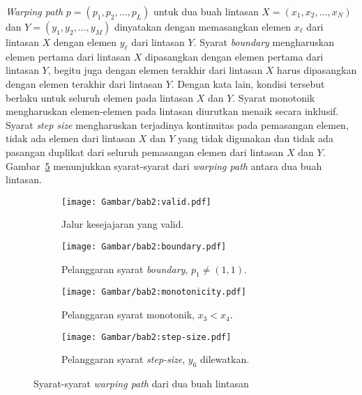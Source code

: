 \textit{Warping path} $p = (p_1, p_2, \ldots, p_L)$ untuk dua buah lintasan $X = (x_1, x_2, \ldots, x_N)$ dan $Y = (y_1, y_2, \ldots, y_M)$ dinyatakan dengan memasangkan elemen $x_\ell$ dari lintasan $X$ dengan elemen $y_\ell$ dari lintasan $Y$. Syarat \textit{boundary} mengharuskan elemen pertama dari lintasan $X$ dipasangkan dengan elemen pertama dari lintasan $Y$, begitu juga dengan elemen terakhir dari lintasan $X$ harus dipasangkan dengan elemen terakhir dari lintasan $Y$. Dengan kata lain, kondisi tersebut berlaku untuk seluruh elemen pada lintasan $X$ dan $Y$. Syarat monotonik mengharuskan elemen-elemen pada lintasan diurutkan menaik secara inklusif. Syarat \textit{step size} mengharuskan terjadinya kontinuitas pada pemasangan elemen, tidak ada elemen dari lintasan $X$ dan $Y$ yang tidak digunakan dan tidak ada pasangan duplikat dari seluruh pemasangan elemen dari lintasan $X$ dan $Y$. Gambar~\ref{bab2:dtw-requirements} menunjukkan syarat-syarat dari \textit{warping path} antara dua buah lintasan.

\vspace{10pt}

\begin{figure}[h]
    \centering
    \begin{subfigure}[ht]{0.225\textwidth}
        \centering
        \texttt{[image: Gambar/bab2:valid.pdf]}
        \caption{Jalur kesejajaran yang valid.}
        \label{bab2:valid}
    \end{subfigure}
    \begin{subfigure}[ht]{0.225\textwidth}
        \centering
        \texttt{[image: Gambar/bab2:boundary.pdf]}
        \caption{Pelanggaran syarat \textit{boundary}, $p_1 \neq (1, 1)$.}
        \label{bab2:boundary}
    \end{subfigure}
    \begin{subfigure}[ht]{0.225\textwidth}
        \centering
        \texttt{[image: Gambar/bab2:monotonicity.pdf]}
        \caption{Pelanggaran syarat monotonik, $x_3 < x_4$.}
        \label{bab2:monotonicity}
    \end{subfigure}
    \begin{subfigure}[h]{0.225\textwidth}
        \centering
        \texttt{[image: Gambar/bab2:step-size.pdf]}
        \caption{Pelanggaran syarat \textit{step-size}, $y_6$ dilewatkan.}
        \label{bab2:step-size}
    \end{subfigure}
    \caption[Syarat-syarat \textit{warping path}]{Syarat-syarat \textit{warping path} dari dua buah lintasan}
    \label{bab2:dtw-requirements}
\end{figure}

